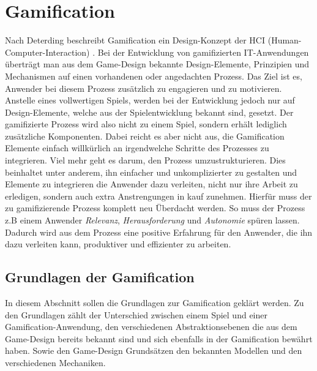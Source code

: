 \documentclass[a4paper,12pt]{scrartcl}
\begin{document}
\section{Gamification}
Nach Deterding beschreibt Gamification ein Design-Konzept der HCI (Human-Computer-Interaction) \cite{Deterding2011}. Bei der Entwicklung von gamifizierten IT-Anwendungen überträgt man aus dem Game-Design bekannte Design-Elemente, Prinzipien und Mechanismen auf einen vorhandenen oder angedachten Prozess. Das Ziel ist es, Anwender bei diesem Prozess zusätzlich zu engagieren und zu motivieren. Anstelle eines vollwertigen Spiels, werden bei der Entwicklung jedoch nur auf Design-Elemente, welche aus der Spielentwicklung bekannt sind, gesetzt. Der gamifizierte Prozess wird also nicht zu einem Spiel, sondern erhält lediglich zusätzliche Komponenten. Dabei reicht es aber nicht aus, die Gamification Elemente einfach willkürlich an irgendwelche Schritte des Prozesses zu integrieren. Viel mehr geht es darum, den Prozess umzustrukturieren. Dies beinhaltet unter anderem, ihn einfacher und unkomplizierter zu gestalten und Elemente zu integrieren die Anwender dazu verleiten, nicht nur ihre Arbeit zu erledigen, sondern auch extra Anstrengungen in kauf zunehmen. Hierfür muss der zu gamifizierende Prozess komplett neu Überdacht werden. So muss der Prozess z.B einem Anwender \textit{Relevanz}, \textit{Herausforderung} und \textit{Autonomie} spüren lassen. Dadurch wird aus dem Prozess eine positive Erfahrung für den Anwender, die ihn dazu verleiten kann, produktiver und effizienter zu arbeiten.

\subsection{Grundlagen der Gamification}
In diesem Abschnitt sollen die Grundlagen zur Gamification geklärt werden. Zu den Grundlagen zählt der Unterschied zwischen einem Spiel und einer Gamification-Anwendung, den verschiedenen Abstraktionsebenen die aus dem Game-Design bereits bekannt sind und sich ebenfalls in der Gamification bewährt haben. Sowie den Game-Design Grundsätzen den bekannten Modellen und den verschiedenen Mechaniken. 
\end{document}

